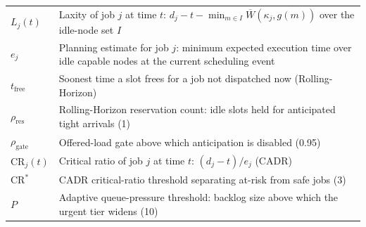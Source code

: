 \begin{longtable}{l>{\raggedright\arraybackslash}p{10cm}}
$L_j(t)$ & Laxity of job $j$ at time $t$: $d_j - t - \min_{m \in I} \overline{W}(\kappa_j, g(m))$ over the idle-node set $I$ \\
$e_j$ & Planning estimate for job $j$: minimum expected execution time over idle capable nodes at the current scheduling event \\
$t_{\text{free}}$ & Soonest time a slot frees for a job not dispatched now (Rolling-Horizon) \\
$\rho_{\text{res}}$ & Rolling-Horizon reservation count: idle slots held for anticipated tight arrivals (1) \\
$\rho_{\text{gate}}$ & Offered-load gate above which anticipation is disabled (0.95) \\
$\mathrm{CR}_j(t)$ & Critical ratio of job $j$ at time $t$: $(d_j - t)/e_j$ (CADR) \\
$\mathrm{CR}^*$ & CADR critical-ratio threshold separating at-risk from safe jobs (3) \\
$P$ & Adaptive queue-pressure threshold: backlog size above which the urgent tier widens (10) \\
\end{longtable}
